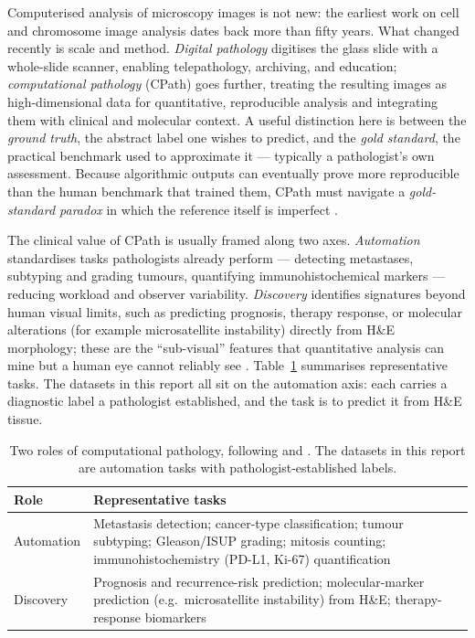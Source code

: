 \documentclass[11pt]{article}
\begin{document}
Computerised analysis of microscopy images is not new: the earliest work on cell and chromosome
image analysis dates back more than fifty years. What changed
recently is scale and method. \emph{Digital pathology} digitises the glass slide with a
whole-slide scanner, enabling telepathology, archiving, and education; \emph{computational
pathology} (CPath) goes further, treating the resulting images as high-dimensional data for
quantitative, reproducible analysis and integrating them with clinical and molecular context. A useful distinction
here is between the \emph{ground truth}, the abstract label one wishes to predict, and the
\emph{gold standard}, the practical benchmark used to approximate it --- typically a pathologist's
own assessment. Because algorithmic outputs can eventually prove more reproducible than the human
benchmark that trained them, CPath must navigate a \emph{gold-standard paradox} in which the
reference itself is imperfect \citep{abels2019computationalPathology,madabhushi2016imageAnalysis,hosseini2024computationalPathology}.

The clinical value of CPath is usually framed along two axes.
\emph{Automation} standardises tasks pathologists already perform --- detecting metastases,
subtyping and grading tumours, quantifying immunohistochemical markers --- reducing workload and
observer variability. \emph{Discovery} identifies signatures beyond human visual limits, such as
predicting prognosis, therapy response, or molecular alterations (for example microsatellite
instability) directly from H\&E morphology; these are the ``sub-visual'' features that quantitative
analysis can mine but a human eye cannot reliably see \citep{song2023aiPathology,madabhushi2016imageAnalysis}.
Table~\ref{tab:cpath-tasks} summarises representative tasks. The datasets in this report all sit
on the automation axis: each carries a diagnostic label a pathologist established, and the task is
to predict it from H\&E tissue.

\begin{table}[ht]
  \centering
  \small
  \begin{tabularx}{\linewidth}{@{}lX@{}}
    \toprule
    Role & Representative tasks\\
    \midrule
    Automation & Metastasis detection; cancer-type classification; tumour subtyping; Gleason/ISUP
                 grading; mitosis counting; immunohistochemistry (PD-L1, Ki-67) quantification\\
    Discovery  & Prognosis and recurrence-risk prediction; molecular-marker prediction (e.g.\
                 microsatellite instability) from H\&E; therapy-response biomarkers\\
    \bottomrule
  \end{tabularx}
  \caption{Two roles of computational pathology, following \citet{song2023aiPathology} and
  \citet{madabhushi2016imageAnalysis}. The datasets in this report are automation tasks with
  pathologist-established labels.}
  \label{tab:cpath-tasks}
\end{table}
\end{document}
